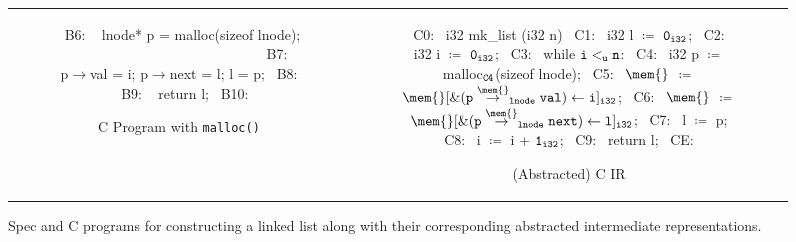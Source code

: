 \begin{figure}[H]
\begin{tabular}{cc}
\begin{subfigure}[b]{0.565\textwidth}
\begin{center}
\begin{allLangEnvScript}
{{~{\tiny \textcolor{mygray}{B6: }}~     lnode* p = malloc(sizeof lnode);                       $\phantom{m \coloneqq \mathrm{\tt m[\&\structPointer{\tt p}{m}{lnode}{next} \leftarrow l]_{i32}};}$
~{\tiny \textcolor{mygray}{B7: }}~     p$\rightarrow$val = i; p$\rightarrow$next = l; l = p;
~{\tiny \textcolor{mygray}{B8: }}~   }
~{\tiny \textcolor{mygray}{B9: }}~   return l;
~{\tiny \textcolor{mygray}{B10:}}~ }
\end{allLangEnvScript}
\end{center}
\caption{\label{fig:llAllocC}C Program with {\tt malloc()}}
\end{subfigure}%
&
\begin{subfigure}[b]{0.435\textwidth}
\begin{center}
\begin{allLangEnvScript}
~{\tiny \textcolor{mygray}{C0:}}~ i32 mk_list (i32 n) {
~{\tiny \textcolor{mygray}{C1:}}~   i32 l $\coloneqq$ ${\tt 0_{i32}}$;
~{\tiny \textcolor{mygray}{C2:}}~   i32 i $\coloneqq$ ${\tt 0_{i32}}$;
~{\tiny \textcolor{mygray}{C3:}}~   while ${\tt i <_{u} n}$:
~{\tiny \textcolor{mygray}{C4:}}~     i32 p $\coloneqq$ malloc$_{\tt C4}$(sizeof lnode);
~{\tiny \textcolor{mygray}{C5:}}~     $\mem{}$ $\coloneqq$ $\mathrm{\tt \mem{}[ \& (\structPointer{\tt p}{\mem{}}{lnode}{val}) \leftarrow i]_{i32}}$;
~{\tiny \textcolor{mygray}{C6:}}~     $\mem{}$ $\coloneqq$ $\mathrm{\tt \mem{}[\&  (\structPointer{\tt p}{\mem{}}{lnode}{next}) \leftarrow l]_{i32}}$;
~{\tiny \textcolor{mygray}{C7:}}~     l $\coloneqq$ p;
~{\tiny \textcolor{mygray}{C8:}}~     i $\coloneqq$ i + ${\tt 1_{i32}}$;
~{\tiny \textcolor{mygray}{C9:}}~   return l;
~{\tiny \textcolor{mygray}{CE:}}~ }
\end{allLangEnvScript}
\end{center}
\caption{\label{fig:llAllocCIR}(Abstracted) C IR}
\end{subfigure}%
\\
\end{tabular}
\caption{\label{fig:llAllocSpecAndC}Spec and C programs for constructing a linked list along with their corresponding abstracted intermediate representations.}
\end{figure}